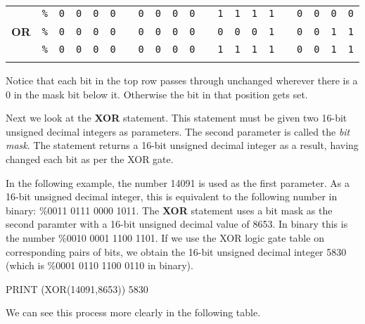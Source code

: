 \begin{center}
	\begin{tabular}{ccccccccccccccccccccc}
	  & \texttt{\%} & \texttt{0} & \texttt{0} & \texttt{0} & \texttt{0} & & \texttt{0} & \texttt{0} & \texttt{0} & \texttt{0} & & \texttt{1} & \texttt{1} & \texttt{1} & \texttt{1} & & \texttt{0} & \texttt{0} & \texttt{0} & \texttt{0} \\
	  {\bf OR} & \texttt{\%} & \texttt{0} & \texttt{0} & \texttt{0} & \texttt{0} & & \texttt{0} & \texttt{0} & \texttt{0} & \texttt{0} & & \texttt{0} & \texttt{0} & \texttt{0} & \texttt{1} & & \texttt{0} & \texttt{0} & \texttt{1} & \texttt{1} \\ \hline
	  & \texttt{\%} & \texttt{0} & \texttt{0} & \texttt{0} & \texttt{0} & & \texttt{0} & \texttt{0} & \texttt{0} & \texttt{0} & & \texttt{1} & \texttt{1} & \texttt{1} & \texttt{1} & & \texttt{0} & \texttt{0} & \texttt{1} & \texttt{1} \\ \hhline{=====================}
	  \end{tabular}
\end{center}

Notice that each bit in the top row passes through unchanged wherever there is a 0 in the mask bit below it. Otherwise the bit in that position gets set.

Next we look at the {\bf XOR} statement. This statement must be given two 16-bit unsigned decimal integers as parameters. The second parameter is called the {\it bit mask}. The statement returns a 16-bit unsigned decimal integer as a result, having changed each bit as per the XOR gate.

In the following example, the number 14091 is used as the first parameter. As a 16-bit unsigned decimal integer, this is equivalent to the following number in binary: \%0011 0111 0000 1011. The {\bf XOR} statement uses a bit mask as the second paramter with a 16-bit unsigned decimal value of 8653. In binary this is the number \%0010 0001 1100 1101. If we use the XOR logic gate table on corresponding pairs of bits, we obtain the 16-bit unsigned decimal integer 5830 (which is \%0001 0110 1100 0110 in binary).
\begin{screenoutput}
	PRINT (XOR(14091,8653))
	5830
\end{screenoutput}

We can see this process more clearly in the following table.

